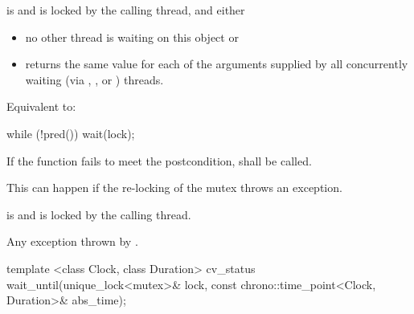 \begin{itemdescr}
\pnum
\requires {} is  and  is
locked by the calling thread, and either

\begin{itemize}
\item no other thread is waiting on this  object or
\item {} returns the same value for each of the 
arguments supplied by all concurrently waiting (via ,
, or ) threads.
\end{itemize}

\pnum
\effects Equivalent to:
\begin{codeblock}
while (!pred())
  wait(lock);
\end{codeblock}

\pnum
\remarks
If the function fails to meet the postcondition, 
shall be called.
\begin{note} This can happen if the re-locking of the mutex throws an exception. \end{note}

\pnum
\postconditions {} is  and 
is locked by the calling thread.

\pnum
\throws Any exception thrown by .

\end{itemdescr}

%
\begin{itemdecl}
template <class Clock, class Duration>
  cv_status wait_until(unique_lock<mutex>& lock,
                       const chrono::time_point<Clock, Duration>& abs_time);
\end{itemdecl}

